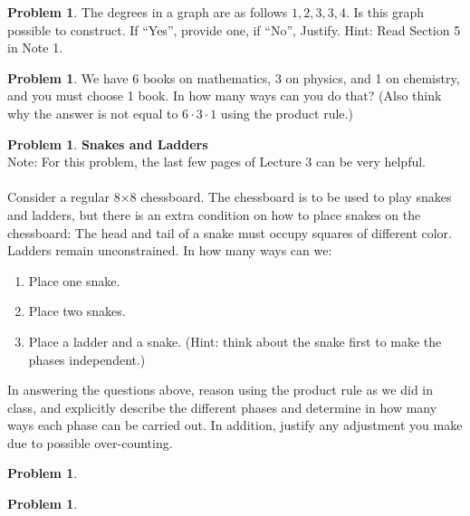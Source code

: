 \documentclass[10pt,leqno ]{article}
\theoremstyle{definition}
\newtheorem{problem}[theorem]{Problem}
\begin{document}
\begin{problem} The degrees in a graph are as follows ${1,2,3,3,4}$.  Is this graph possible to construct.  If “Yes”, provide one, if “No”, Justify.  Hint:  Read Section 5 in Note 1.

\end{problem}
\newpage

\begin{problem} We have 6 books on mathematics, 3 on physics, and 1 on chemistry, and you must choose 1 book.  In how many ways can you do that?  (Also think why the answer is not equal to $6 \cdot 3 \cdot 1$ using the product rule.)

\end{problem}
\newpage

\begin{problem} \textbf{Snakes and Ladders} \\
Note:  For this problem, the last few pages of Lecture 3 can be very helpful.
\\\\
Consider  a  regular  8×8  chessboard.   The  chessboard  is  to  be  used  to  play snakes and ladders, but there is an extra condition on how to place snakes on the chessboard:  The head and tail of a snake must occupy squares of different color.  Ladders remain unconstrained.  In how many ways can we:
\begin{enumerate}[label=()a)]
\item Place one snake.
\item Place two snakes.
\item Place a ladder and a snake.  (Hint:  think about the snake first to make the phases independent.)
\end{enumerate}
In answering the questions above,  reason using the product rule as we did in class, and explicitly describe the different phases and determine in how many ways each phase can be carried out.  In addition,  justify any adjustment you make due to possible over-counting.
\end{problem}
\newpage

\begin{problem} 

\end{problem}
\newpage

\begin{problem} 

\end{problem}
\newpage
\end{document}
